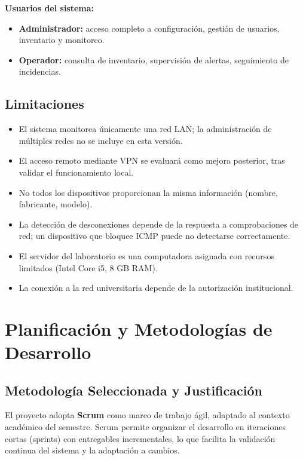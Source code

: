 \documentclass[12pt,a4paper]{report}
\begin{document}
\textbf{Usuarios del sistema:}
\begin{itemize}
  \item \textbf{Administrador:} acceso completo a configuración, gestión de usuarios, inventario y monitoreo.
  \item \textbf{Operador:} consulta de inventario, supervisión de alertas, seguimiento de incidencias.
\end{itemize}

\section{Limitaciones}

\begin{itemize}
  \item El sistema monitorea únicamente una red LAN; la administración de múltiples redes no se incluye en esta versión.
  \item El acceso remoto mediante VPN se evaluará como mejora posterior, tras validar el funcionamiento local.
  \item No todos los dispositivos proporcionan la misma información (nombre, fabricante, modelo).
  \item La detección de desconexiones depende de la respuesta a comprobaciones de red; un dispositivo que bloquee ICMP puede no detectarse correctamente.
  \item El servidor del laboratorio es una computadora asignada con recursos limitados (Intel Core i5, 8 GB RAM).
  \item La conexión a la red universitaria depende de la autorización institucional.
\end{itemize}

\chapter{Planificación y Metodologías de Desarrollo}

\section{Metodología Seleccionada y Justificación}

El proyecto adopta \textbf{Scrum} como marco de trabajo ágil, adaptado al contexto académico del semestre. Scrum permite organizar el desarrollo en iteraciones cortas (sprints) con entregables incrementales, lo que facilita la validación continua del sistema y la adaptación a cambios.
\end{document}

